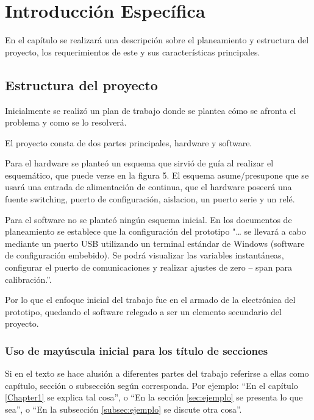 \chapter{Introducción Específica} %

\label{Chapter2}

En el capítulo se realizará una descripción sobre el planeamiento y estructura del proyecto, los requerimientos de este  y sus características principales.
\section{Estructura del proyecto}
\label{sec:cap2parte1}
Inicialmente se realizó un plan de trabajo donde se plantea cómo se afronta el problema y como se lo resolverá.

El proyecto consta de dos partes principales, hardware y software.

Para el hardware se planteó un esquema que sirvió de guía al realizar el esquemático, que puede verse en la figura 5. El esquema asume/presupone que se usará una entrada de alimentación de continua, que el hardware poseerá una fuente switching, puerto de configuración, aislacion, un puerto serie y un relé.

Para el software no se planteó ningún esquema inicial. En los documentos de planeamiento se establece que la configuración del prototipo "… se llevará a cabo  mediante un puerto USB utilizando un terminal estándar de Windows (software de configuración embebido). Se podrá visualizar las variables instantáneas, configurar el puerto de comunicaciones y realizar ajustes de zero – span para calibración.”.

Por lo que el enfoque inicial del trabajo fue en el armado de la electrónica del prototipo, quedando el software relegado a ser un  elemento secundario del proyecto.



\subsection{Uso de mayúscula inicial para los título de secciones}

Si en el texto se hace alusión a diferentes partes del trabajo referirse a ellas como capítulo, sección o subsección según corresponda. Por ejemplo: ``En el capítulo \ref{Chapter1} se explica tal cosa'', o ``En la sección \ref{sec:ejemplo} se presenta lo que sea'', o ``En la subsección \ref{subsec:ejemplo} se discute otra cosa''.

